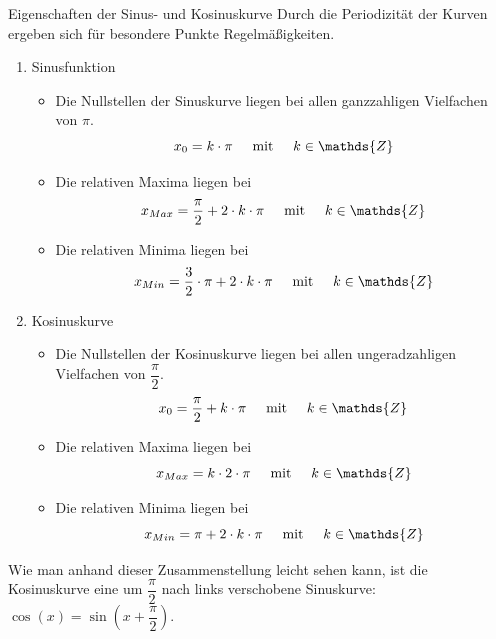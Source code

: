 \begin{merke}{Eigenschaften der Sinus- und Kosinuskurve}{} \label{SinCosEigenschaften}
    Durch die Periodizität der Kurven ergeben sich für besondere Punkte Regelmäßigkeiten.
    \begin{enumerate}
        \item Sinusfunktion
    \begin{itemize}
        \item Die Nullstellen der Sinuskurve liegen bei allen ganzzahligen Vielfachen von $\pi$. $$x_{0} = k\cdot \pi \hspace{0.5cm} \text{mit} \hspace{0.5cm} k\in \mathds{Z}$$
        \item Die relativen Maxima liegen bei $$x_{Max} = \dfrac{\pi}{2} + 2\cdot k\cdot \pi \hspace{0.5cm} \text{mit} \hspace{0.5cm} k\in \mathds{Z}$$
        \item Die relativen Minima liegen bei $$x_{Min} = \dfrac{3}{2}\cdot \pi + 2\cdot k\cdot \pi \hspace{0.5cm} \text{mit} \hspace{0.5cm} k\in \mathds{Z}$$
    \end{itemize}
    \item Kosinuskurve
    \begin{itemize}
        \item Die Nullstellen der Kosinuskurve liegen bei allen ungeradzahligen Vielfachen von $\dfrac{\pi}{2}$. $$x_{0} = \dfrac{\pi}{2}+ k \cdot \pi\hspace{0.5cm} \text{mit} \hspace{0.5cm} k\in \mathds{Z}$$
        \item Die relativen Maxima liegen bei $$x_{Max} = k\cdot 2\cdot\pi \hspace{0.5cm} \text{mit} \hspace{0.5cm} k\in \mathds{Z}$$
        \item Die relativen Minima liegen bei $$x_{Min} =  \pi + 2\cdot k\cdot \pi \hspace{0.5cm} \text{mit} \hspace{0.5cm} k\in \mathds{Z}$$
    \end{itemize}
        \end{enumerate}
Wie man anhand dieser Zusammenstellung leicht sehen kann, ist die Kosinuskurve eine um $\dfrac{\pi}{2}$ nach links verschobene Sinuskurve: $\cos(x) = \sin\left(x+\dfrac{\pi}{2}\right)$.
\end{merke}
